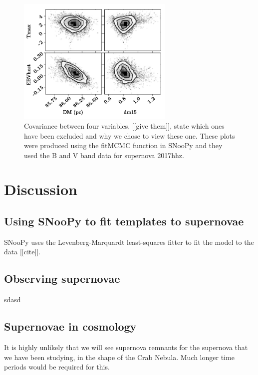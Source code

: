 \documentclass[twocolumn]{revtex4}
\begin{document}
\begin{figure}[!h]
\begin{center}
\includegraphics[width=7.5cm]{results/covariance/covariance}
\caption[]{Covariance between four variables, [[give them]], state which ones have been excluded and why we chose to view these one. These plots were produced using the fitMCMC function in SNooPy and they used the B and V band data for supernova 2017hhz.}
\label{2017hle-data}
\end{center}
\end{figure}

\vspace{-3ex}
\section{Discussion}
\label{discussion}
\vspace{-2ex}

\subsection{Using SNooPy to fit templates to supernovae}
SNooPy uses the Levenberg-Marquardt least-squares fitter to fit the model to the data [[cite]]. 

\subsection{Observing supernovae}
sdasd

\subsection{Supernovae in cosmology}

It is highly unlikely that we will see supernova remnants for the supernova that we have been studying, in the shape of the Crab Nebula. Much longer time periods would be required for this. 
\end{document}
